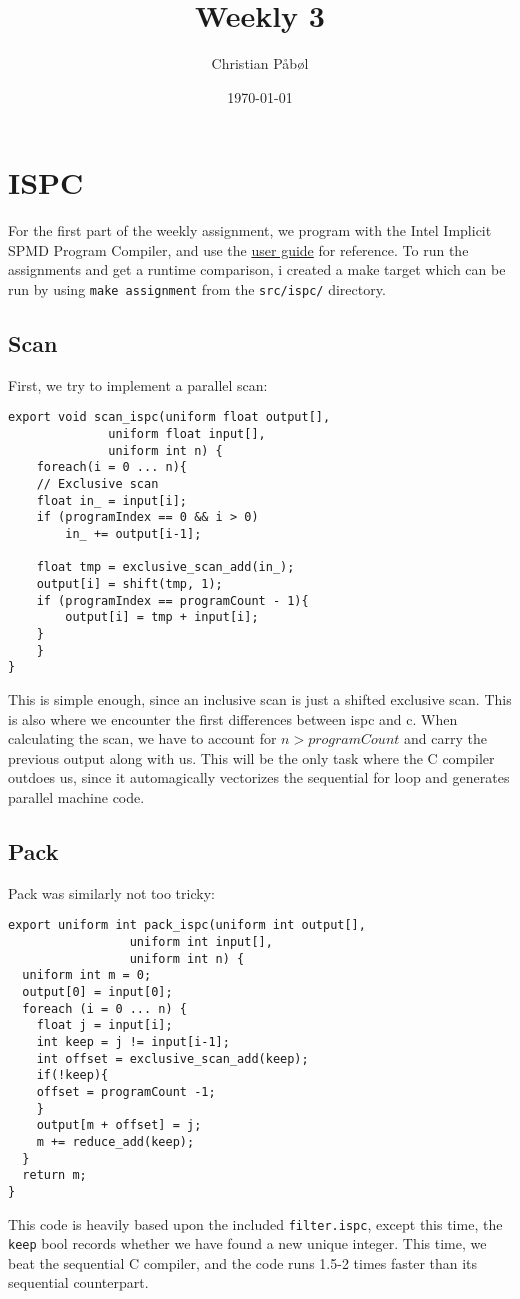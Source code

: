 \documentclass[11pt]{article}
\author{Christian Påbøl}
\date{\today}
\title{Weekly 3}
\begin{document}
\maketitle
\tableofcontents


\section{ISPC}
\label{sec:org4cc76c5}
For the first part of the weekly assignment, we program with the
Intel Implicit SPMD Program Compiler, and use the \href{https://ispc.github.io/ispc.html}{user guide} for reference. 
To run the assignments and get a runtime comparison, i created a make target
which can be run by using \texttt{make assignment} from the \texttt{src/ispc/} directory.
\subsection{Scan}
\label{sec:org702a113}
First, we try to implement a parallel scan:
\begin{verbatim}
export void scan_ispc(uniform float output[], 
		      uniform float input[],
		      uniform int n) {
    foreach(i = 0 ... n){
    // Exclusive scan
	float in_ = input[i];
	if (programIndex == 0 && i > 0)
	    in_ += output[i-1];

	float tmp = exclusive_scan_add(in_);
	output[i] = shift(tmp, 1);
	if (programIndex == programCount - 1){
	    output[i] = tmp + input[i];
	}
    }
}
\end{verbatim}
This is simple enough, since an inclusive scan is just a shifted exclusive scan.
This is also where we encounter the first differences between ispc and c. When
calculating the scan, we have to account for \(n > programCount\) and carry the
previous output along with us.  
This will be the only task where the C compiler outdoes us, since it automagically
vectorizes the sequential for loop and generates parallel machine code.

\subsection{Pack}
\label{sec:org3628ddb}
Pack was similarly not too tricky:

\begin{verbatim}
export uniform int pack_ispc(uniform int output[],
			     uniform int input[],
			     uniform int n) {
  uniform int m = 0;
  output[0] = input[0];
  foreach (i = 0 ... n) {
    float j = input[i];
    int keep = j != input[i-1];
    int offset = exclusive_scan_add(keep);
    if(!keep){
	offset = programCount -1;
    }
    output[m + offset] = j;
    m += reduce_add(keep);
  }
  return m;
}

\end{verbatim}
This code is heavily based upon the included \texttt{filter.ispc}, except this
time, the \texttt{keep} bool records whether we have found a new unique integer.  
This time, we beat the sequential C compiler, and the code runs 1.5-2 times
faster than its sequential counterpart.
\end{document}
